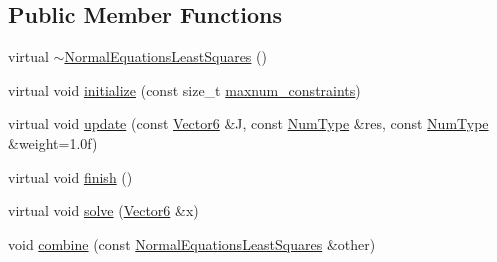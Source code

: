 \subsection*{Public Member Functions}
\begin{DoxyCompactItemize}
\item 
virtual \mbox{\hyperlink{classdvo_1_1core_1_1_normal_equations_least_squares_a7507274ad0f440898f4eaa7c24874c81}{$\sim$\+Normal\+Equations\+Least\+Squares}} ()
\item 
virtual void \mbox{\hyperlink{classdvo_1_1core_1_1_normal_equations_least_squares_a4799d66e3dc176ab07418fc1cfacfb53}{initialize}} (const size\+\_\+t \mbox{\hyperlink{classdvo_1_1core_1_1_normal_equations_least_squares_a59cc5b0c4bc11f31fff1a4dfd5ad1fe7}{maxnum\+\_\+constraints}})
\item 
virtual void \mbox{\hyperlink{classdvo_1_1core_1_1_normal_equations_least_squares_a1ef767b22d889c99850b1b2dd8cd870d}{update}} (const \mbox{\hyperlink{namespacedvo_1_1core_a05327f3312d32a301bce9fccda9e5807}{Vector6}} \&J, const \mbox{\hyperlink{namespacedvo_1_1core_ab9c199d221775a923e2549ad7e15c323}{Num\+Type}} \&res, const \mbox{\hyperlink{namespacedvo_1_1core_ab9c199d221775a923e2549ad7e15c323}{Num\+Type}} \&weight=1.\+0f)
\item 
virtual void \mbox{\hyperlink{classdvo_1_1core_1_1_normal_equations_least_squares_a0da5301414f684b8e3ebfa9c4794af31}{finish}} ()
\item 
virtual void \mbox{\hyperlink{classdvo_1_1core_1_1_normal_equations_least_squares_a8a25d3970f6506df2066995f2f2effda}{solve}} (\mbox{\hyperlink{namespacedvo_1_1core_a05327f3312d32a301bce9fccda9e5807}{Vector6}} \&x)
\item 
void \mbox{\hyperlink{classdvo_1_1core_1_1_normal_equations_least_squares_a9665b0bf93aac4348dc9ad18c39cf886}{combine}} (const \mbox{\hyperlink{classdvo_1_1core_1_1_normal_equations_least_squares}{Normal\+Equations\+Least\+Squares}} \&other)
\end{DoxyCompactItemize}
